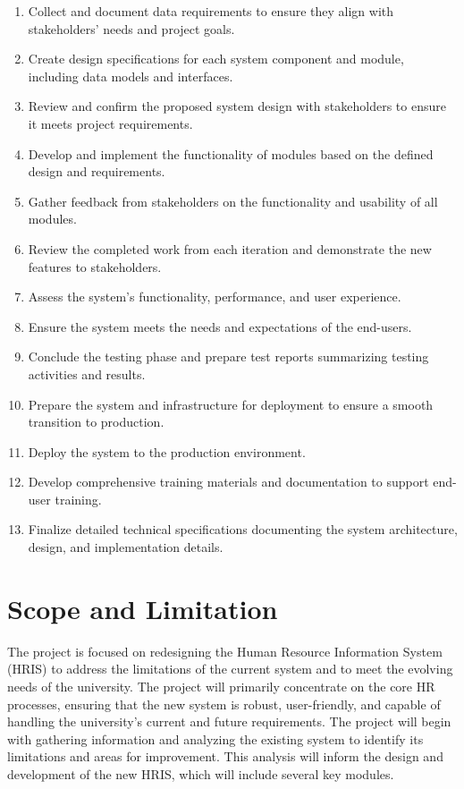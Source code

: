     \begin{enumerate}
        \item Collect and document data requirements to ensure they align with stakeholders' needs and project goals.
        \item Create design specifications for each system component and module, including data models and interfaces.
        \item Review and confirm the proposed system design with stakeholders to ensure it meets project requirements.
        \item Develop and implement the functionality of modules based on the defined design and requirements.

        \item Gather feedback from stakeholders on the functionality and usability of all modules.
        \item Review the completed work from each iteration and demonstrate the new features to stakeholders.
        \item Assess the system's functionality, performance, and user experience.
        \item Ensure the system meets the needs and expectations of the end-users.
        \item Conclude the testing phase and prepare test reports summarizing testing activities and results.
        \item Prepare the system and infrastructure for deployment to ensure a smooth transition to production.
        \item Deploy the system to the production environment.
        \item Develop comprehensive training materials and documentation to support end-user training.
        \item Finalize detailed technical specifications documenting the system architecture, design, and implementation details.
    \end{enumerate}
    
\section{Scope and Limitation}
    
    The project is focused on redesigning the Human Resource Information System (HRIS) to address the limitations of the current system and to meet the evolving needs of the university. The project will primarily concentrate on the core HR processes, ensuring that the new system is robust, user-friendly, and capable of handling the university's current and future requirements. The project will begin with gathering information and analyzing the existing system to identify its limitations and areas for improvement. This analysis will inform the design and development of the new HRIS, which will include several key modules.
    
